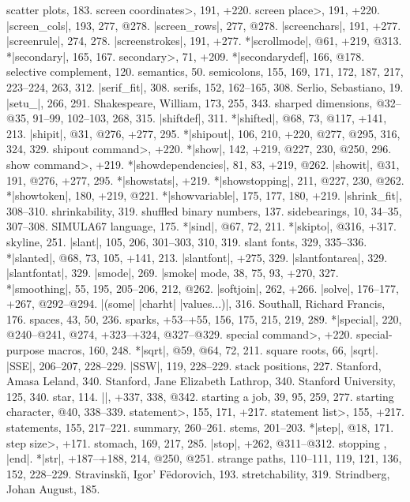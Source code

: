 scatter plots, 183.
\<screen coordinates>, 191, +220.
\<screen place>, 191, +220.
|screen_cols|, 193, 277, @278.
|screen_rows|, 277, @278.
|screenchars|, 191, +277.
|screenrule|, 274, 278.
|screenstrokes|, 191, +277.
*|scrollmode|, @61, +219, @313.
*|secondary|, 165, 167.
\<secondary>, 71, +209.
*|secondarydef|, 166, @178.
selective complement, 120.
semantics, 50.
semicolons, 155, 169, 171, 172, 187, 217, 223--224, 263, 312.
|serif_fit|, 308.
serifs, 152, 162--165, 308.
Serlio, Sebastiano, 19.
|setu_|, 266, 291.
Shakespeare, William, 173, 255, 343.
sharped dimensions, @32--@35, 91--99, 102--103, 268, 315.
|shiftdef|, 311.
*|shifted|, @68, 73, @117, +141, 213.
|shipit|, @31, @276, +277, 295.
*|shipout|, 106, 210, +220, @277, @295, 316, 324, 329.
\<shipout command>, +220.
*|show|, 142, +219, @227, 230, @250, 296.
\<show command>, +219.
*|showdependencies|, 81, 83, +219, @262.
|showit|, @31, 191, @276, +277, 295.
*|showstats|, +219.
*|showstopping|, 211, @227, 230, @262.
*|showtoken|, 180, +219, @221.
*|showvariable|, 175, 177, 180, +219.
|shrink_fit|, 308--310.
shrinkability, 319.
shuffled binary numbers, 137.
sidebearings, 10, 34--35, 307--308.
{\sevenrm SIMULA67} language, 175.
*|sind|, @67, 72, 211.
*|skipto|, @316, +317.
skyline, 251.
|slant|, 105, 206, 301--303, 310, 319.
slant fonts, 329, 335--336.
*|slanted|, @68, 73, 105, +141, 213.
|slantfont|, +275, 329.
|slantfontarea|, 329.
|slantfontat|, 329.
|smode|, 269.
|smoke| mode, 38, 75, 93, +270, 327.
*|smoothing|, 55, 195, 205--206, 212, @262.
|softjoin|, 262, +266.
|solve|, 176--177, +267, @292--@294.
|(some| |charht| |values...)|, 316.
Southall, Richard Francis, 176.
spaces, 43, 50, 236.
sparks, +53--+55, 156, 175, 215, 219, 289.
*|special|, 220, @240--@241, @274, +323--+324, @327--@329.
\<special command>, +220.
special-purpose macros, 160, 248.
*|sqrt|, @59, @64, 72, 211.
square roots, 66, \also |sqrt|.
|SSE|, 206--207, 228--229.
|SSW|, 119, 228--229.
stack positions, 227.
Stanford, Amasa Leland, 340.
Stanford, Jane Elizabeth Lathrop, 340.
Stanford University, 125, 340.
star, 114.
|\startfont|, +337, 338, @342.
starting a job, 39, 95, 259, 277.
starting character, @40, 338--339.
\<statement>, 155, 171, +217.
\<statement list>, 155, +217.
statements, 155, 217--221.
\sub summary, 260--261.
stems, 201--203.
*|step|, @18, 171.
\<step size>, +171.
stomach, 169, 217, 285.
|stop|, +262, @311--@312.
stopping \MF, \see |end|.
*|str|, +187--+188, 214, @250, @251.
strange paths, 110--111, 119, 121, 136, 152, 228--229.
Stravinski{\u\i}, Igor' F\"edorovich, 193.
stretchability, 319.
Strindberg, Johan August, 185.
